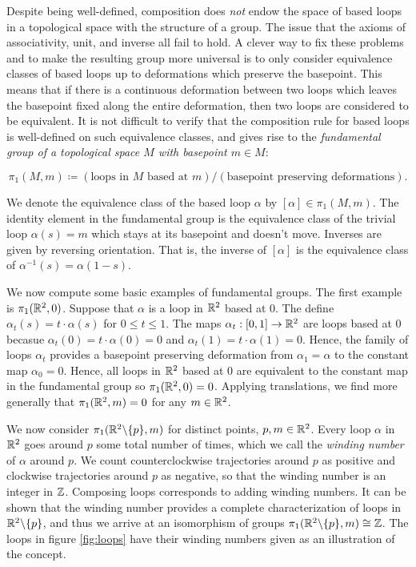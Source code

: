 Despite being well-defined, composition does \textit{not} endow the space of based loops in a topological space with the structure of a group. The issue that the axioms of associativity, unit, and inverse all fail to hold. A clever way to fix these problems and to make the resulting group more universal is to only consider equivalence classes of based loops up to deformations which preserve the basepoint. This means that if there is a continuous deformation between two loops which leaves the basepoint fixed along the entire deformation, then two loops are considered to be equivalent. It is not difficult to verify that the composition rule for based loops is well-defined on such equivalence classes, and gives rise to the \textit{fundamental group of a topological space $M$ with basepoint $m\in M$}:

$$\pi_1(M,m)\coloneqq \left(\text{loops in $M$ based at $m$}\right)/\left(\text{basepoint preserving deformations}\right).$$

We denote the equivalence class of the based loop $\alpha$ by $[\alpha]\in \pi_1(M,m)$. The identity element in the fundamental group is the equivalence class of the trivial loop $\alpha(s)=m$ which stays at its basepoint and doesn't move. Inverses are given by reversing orientation. That is, the inverse of $[\alpha]$ is the equivalence class of $\alpha^{-1}(s)=\alpha(1-s)$.

We now compute some basic examples of fundamental groups. The first example is $\pi_1(\mathbb{R}^2,0)$. Suppose that $\alpha$ is a loop in $\mathbb{R}^2$ based at $0$. The define $\alpha_t(s)=t\cdot \alpha(s)$ for $0\leq t\leq 1$. The maps $\alpha_t:[0,1]\to \mathbb{R}^2$ are loops based at $0$ becasue $\alpha_t(0)=t\cdot \alpha(0)=0$ and $\alpha_t(1)=t\cdot \alpha(1)=0$. Hence, the family of loops $\alpha_t$ provides a basepoint preserving deformation from $\alpha_1=\alpha$ to the constant map $\alpha_0=0$. Hence, all loops in $\mathbb{R}^2$ based at $0$ are equivalent to the constant map in the fundamental group so $\pi_1(\mathbb{R}^2,0)=0$. Applying translations, we find more generally that $\pi_1(\mathbb{R}^2,m)=0$ for any $m\in \mathbb{R}^2$.

We now consider $\pi_1(\mathbb{R}^2\backslash\{p\},m)$ for distinct points, $p,m\in \mathbb{R}^2$. Every loop $\alpha$ in $\mathbb{R}^2$ goes around $p$ some total number of times, which we call the \textit{winding number} of $\alpha$ around $p$. We count counterclockwise trajectories around $p$ as positive and clockwise trajectories around $p$ as negative, so that the winding number is an integer in $\mathbb{Z}$. Composing loops corresponds to adding winding numbers. It can be shown that the winding number provides a complete characterization of loops in $\mathbb{R}^2\backslash \{p\}$, and thus we arrive at an isomorphism of groups $\pi_1(\mathbb{R}^2\backslash\{p\},m)\cong \mathbb{Z}$. The loops in figure \ref{fig:loops} have their winding numbers given as an illustration of the concept.

